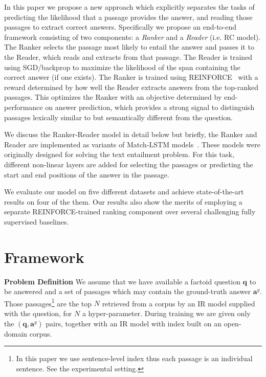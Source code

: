 \documentclass[letterpaper]{article} \usepackage{aaai18}  \usepackage{times}  \usepackage{helvet}  \usepackage{courier}  \usepackage{url}  \usepackage{graphicx}  \usepackage{comment}
\begin{document}
In this paper we propose a new approach 
which explicitly separates the tasks of predicting the likelihood that a passage 
provides 
the answer, and reading those passages to 
extract correct answers.  Specifically we propose an end-to-end framework consisting of two components: a \textit{Ranker} and a \textit{Reader} (i.e. RC model).  The Ranker selects the passage most likely to entail the answer and passes it to the Reader, which reads and extracts from that passage. The Reader is trained using SGD/backprop to maximize the likelihood of the span containing the correct answer (if one exists). The Ranker is trained using REINFORCE~\cite{Williams1992} with a reward determined by how well the Reader extracts answers from the top-ranked passages. This optimizes the Ranker with an objective determined by end-performance on answer prediction, which provides a strong signal to distinguish passages lexically similar to but semantically different from the question.

We discuss the Ranker-Reader model in detail below but briefly, the Ranker and Reader are implemented as variants of
Match-LSTM models~\cite{wang2015learning:NAACL2016}.  These models were originally designed for solving the text entailment problem. For this task, different non-linear layers are added for selecting the passages or predicting the start and end positions of the answer in the passage. 

We evaluate our model on five different datasets and achieve state-of-the-art results on four of the them.  Our results also show the merits of employing a separate REINFORCE-trained ranking component over several challenging fully supervised baselines.


\section{Framework}

\noindent\textbf{Problem Definition}\quad
We assume that we have available a factoid question $\mathbf{q}$ to be answered and a set of passages which may contain the ground-truth answer $\mathbf{a}^g$.  Those passages\footnote{In this paper we use sentence-level index thus each passage is an individual sentence. See the experimental setting.} are the top $N$ retrieved from a corpus by an IR model supplied with the question, for $N$ a hyper-parameter.
During training we are given only the $(\mathbf{q}, \mathbf{a}^g)$ pairs, together with an IR model with index built on an open-domain corpus.\\
\end{document}
